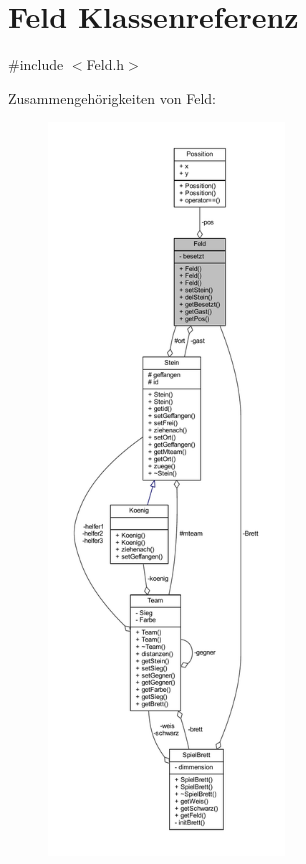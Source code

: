 \hypertarget{class_feld}{}\section{Feld Klassenreferenz}
\label{class_feld}


{\ttfamily \#include $<$Feld.\+h$>$}



Zusammengehörigkeiten von Feld\+:\nopagebreak
\begin{figure}[H]
\begin{center}
\leavevmode
\includegraphics[height=550pt]{class_feld__coll__graph}
\end{center}
\end{figure}
